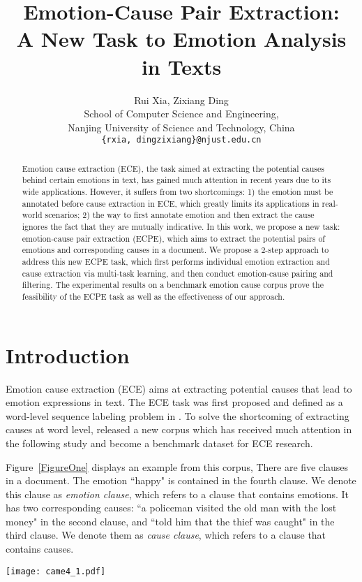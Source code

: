 \documentclass[11pt,a4paper]{article}
\title{Emotion-Cause Pair Extraction: \\A New Task to Emotion Analysis in Texts}
\author{
Rui Xia, Zixiang Ding \\
School of Computer Science and Engineering, \\Nanjing University of Science and Technology, China\\
\texttt{\{rxia, dingzixiang\}@njust.edu.cn}\\
}
\date{}
\begin{document}
\maketitle
\begin{abstract}
  Emotion cause extraction (ECE), the task aimed at extracting the potential causes behind certain emotions in text, has gained much attention in recent years due to its wide applications. However, it suffers from two shortcomings: 1) the emotion must be annotated before cause extraction in ECE, which greatly limits its applications in real-world scenarios; 2) the way to first annotate emotion and then extract the cause ignores the fact that they are mutually indicative. In this work, we propose a new task: emotion-cause pair extraction (ECPE), which aims to extract the potential pairs of emotions and corresponding causes in a document. We propose a 2-step approach to address this new ECPE task, which first performs individual emotion extraction and cause extraction via multi-task learning, and then conduct emotion-cause pairing and filtering. The experimental results on a benchmark emotion cause corpus prove the feasibility of the ECPE task as well as the effectiveness of our approach.
\end{abstract}

\section{Introduction}

Emotion cause extraction (ECE) aims at extracting potential causes that lead to emotion expressions in text.  The ECE task was first proposed and defined as a word-level sequence labeling problem in \citet{lee2010text}. To solve the shortcoming of extracting causes at word level, \citet{gui2016event} released a new corpus which has received much attention in the following study and become a benchmark dataset for ECE research.

Figure~\ref{FigureOne} displays an example from this corpus, There are five clauses in a document. The emotion ``happy" is contained in the fourth clause. We denote this clause as \textit{emotion clause}, which refers to a clause that contains emotions. It has two corresponding causes: ``a policeman visited the old man with the lost money" in the second clause, and ``told him that the thief was caught" in the third clause. We denote them as \textit{cause clause}, which refers to a clause that contains causes.

\begin{figure*}[!t]
	\centering
	\texttt{[image: came4\_1.pdf]}
	\caption{An example showing the difference between the ECE task and the ECPE task.}
	\label{FigureOne}
\end{figure*}
\end{document}
